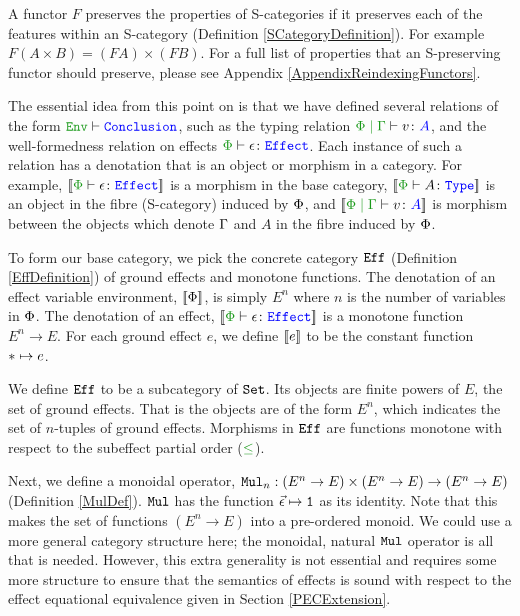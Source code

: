 \documentclass{Report}
\begin{document}
\begin{framed}
    \begin{definition}\label{SPreservingDefinition}
        A functor $F$ preserves the properties of S-categories if it preserves each of the features within an S-category (Definition \ref{SCategoryDefinition}).  For example $F(A\times B) = (FA)\times (FB)$. For a full list of properties that an S-preserving functor should preserve, please see Appendix \ref{AppendixReindexingFunctors}.
    \end{definition}
\end{framed}

The essential idea from this point on is that we have defined several relations of the form $\wellformed{\texttt{Env}}{\texttt{Conclusion}}$, such as the typing relation $\gpetyperelation{v}{A}$, and the well-formedness relation on effects $\wellformedeffect{\P}{\e}$. Each instance of such a relation has a denotation that is an object or morphism in a category. For example, $\deno{\typerelation{\P}{\e}{\effect}}$ is a morphism in the base category, $\deno{\typerelation{\P}{A}{\type}}$ is an object in the fibre (S-category) induced by $\P$, and $\deno{\gpetyperelation{v}{A}}$ is morphism between the objects which denote $\G$ and $A$ in the fibre induced by $\P$.

To form our base category, we pick the concrete category $\Eff$ (Definition \ref{EffDefinition}) of ground effects and monotone functions. The denotation of an effect variable environment, $\deno{\P}$, is simply $E^n$ where $n$ is the number of variables in $\P$. The denotation of an effect, $\deno{\wellformedeffect{\P}{\e}}$ is a monotone function $E^n\rightarrow E$. For each ground effect $e$, we define $\deno{e}$ to be the constant function $\singleton \mapsto e$.


\begin{framed}
    
    \begin{definition}
        \label{EffDefinition}
        We define $\Eff$ to be a subcategory of $\set$. Its objects are finite powers of $E$, the set of ground effects. That is the objects are of the form $E^n$, which indicates the set of $n$-tuples of ground effects. Morphisms in $\Eff$ are functions monotone with respect to the subeffect partial order ($\subeffect$).
    \end{definition}
\end{framed}

Next, we define a monoidal operator, $\Mul_n: (E^n \rightarrow E)\times (E^n \rightarrow E) \rightarrow (E^n \rightarrow E)$ (Definition \ref{MulDef}). $\Mul$ has the function $\ev\mapsto \1$ as its identity. Note that this makes the set of functions $(E^n \rightarrow E)$ into a pre-ordered monoid. We could use a more general category structure here; the monoidal, natural $\Mul$ operator is all that is needed. However, this extra generality is not essential and requires some more structure to ensure that the semantics of effects is sound with respect to the effect equational equivalence given in Section \ref{PECExtension}.
\end{document}
